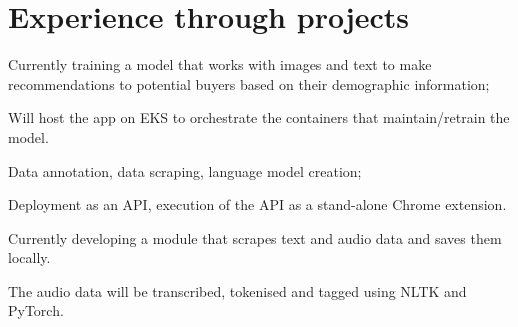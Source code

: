 \documentclass[]{plushcv}
\begin{document}
\begin{minipage}[t]{0.70\textwidth}



\section{Experience through projects}

\begin{tightemize}
\item Currently training a model that works with images and text to make recommendations to potential buyers based on their demographic information;
\item Will host the app on EKS to orchestrate the containers that maintain/retrain the model.
\end{tightemize}
\sectionsep

\begin{tightemize}
\item Data annotation, data scraping, language model creation;
\item Deployment as an API, execution of the API as a stand-alone Chrome extension.
\end{tightemize}
\sectionsep

\begin{tightemize}
\item Currently developing a module that scrapes text and audio data and saves them locally.
\item The audio data will be transcribed, tokenised and tagged using NLTK and PyTorch. 
\end{tightemize}
\sectionsep


\end{minipage}
\end{document}
